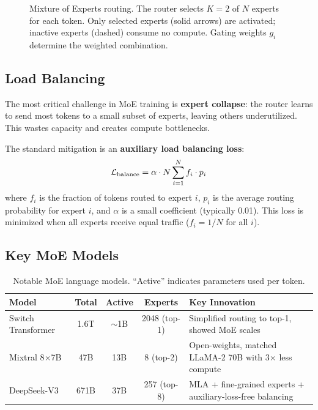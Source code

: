 \begin{figure}[H]
\caption{Mixture of Experts routing.  The router selects $K{=}2$ of $N$
experts for each token.  Only selected experts (solid arrows) are activated;
inactive experts (dashed) consume no compute.  Gating weights $g_i$ determine
the weighted combination.}
\label{fig:moe_routing}
\end{figure}

\subsection{Load Balancing}

The most critical challenge in MoE training is \textbf{expert collapse}: the
router learns to send most tokens to a small subset of experts, leaving
others underutilized.  This wastes capacity and creates compute bottlenecks.

The standard mitigation is an \textbf{auxiliary load balancing loss}:
\begin{equation}
\mathcal{L}_{\text{balance}} = \alpha \cdot N \sum_{i=1}^{N} f_i \cdot p_i
\label{eq:load_balance}
\end{equation}
where $f_i$ is the fraction of tokens routed to expert $i$, $p_i$ is the
average routing probability for expert $i$, and $\alpha$ is a small
coefficient (typically 0.01).  This loss is minimized when all experts
receive equal traffic ($f_i = 1/N$ for all $i$).

\subsection{Key MoE Models}

\begin{table}[H]
\centering
\small
\begin{tabularx}{\textwidth}{@{}l c c c X@{}}
\toprule
\textbf{Model} & \textbf{Total} & \textbf{Active} & \textbf{Experts}
& \textbf{Key Innovation} \\
\midrule
Switch Transformer & 1.6T & $\sim$1B & 2048 (top-1)
  & Simplified routing to top-1, showed MoE scales \\
Mixtral 8$\times$7B & 47B & 13B & 8 (top-2)
  & Open-weights, matched LLaMA-2 70B with 3$\times$ less compute \\
DeepSeek-V3 & 671B & 37B & 257 (top-8)
  & MLA + fine-grained experts + auxiliary-loss-free balancing \\
\bottomrule
\end{tabularx}
\caption{Notable MoE language models.  ``Active'' indicates parameters used
per token.}
\label{tab:moe_models}
\end{table}

